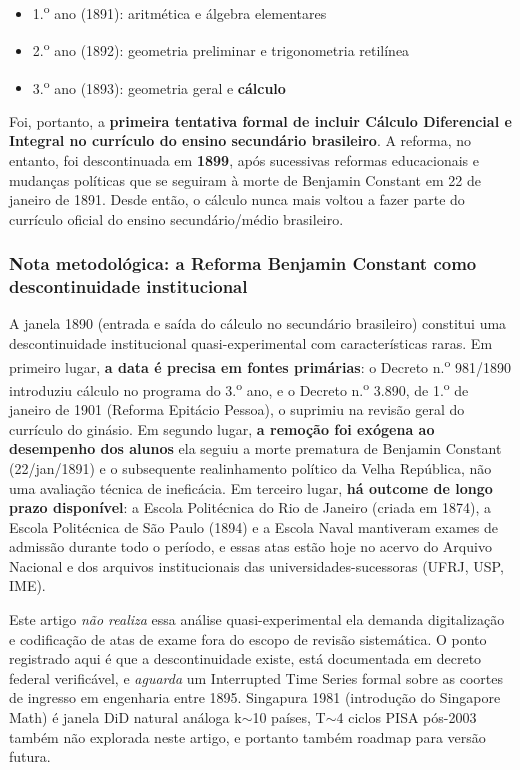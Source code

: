 \documentclass[12pt,a4paper,oneside]{article}
\begin{document}
\begin{itemize}
\item 1.\textsuperscript{o} ano (1891): aritmética e álgebra elementares
\item 2.\textsuperscript{o} ano (1892): geometria preliminar e trigonometria retilínea
\item 3.\textsuperscript{o} ano (1893): geometria geral e \textbf{cálculo}
\end{itemize}

Foi, portanto, a \textbf{primeira tentativa formal de incluir
Cálculo Diferencial e Integral no currículo do ensino secundário
brasileiro}. A reforma, no entanto, foi descontinuada em
\textbf{1899}, após sucessivas reformas educacionais e mudanças
políticas que se seguiram à morte de Benjamin Constant em 22 de
janeiro de 1891. Desde então, o cálculo nunca mais voltou a fazer
parte do currículo oficial do ensino secundário/médio brasileiro.

\subsubsection*{Nota metodológica: a Reforma Benjamin Constant como descontinuidade institucional}

A janela 1890 (entrada e saída do cálculo no
secundário brasileiro) constitui uma descontinuidade institucional
quasi-experimental com características raras. Em primeiro lugar,
\textbf{a data é precisa em fontes primárias}: o Decreto n.\textsuperscript{o}
981/1890 introduziu cálculo no programa do 3.\textsuperscript{o} ano,
e o Decreto n.\textsuperscript{o} 3.890, de 1.\textsuperscript{o}
de janeiro de 1901 (Reforma Epitácio Pessoa), o suprimiu na revisão
geral do currículo do ginásio. Em segundo lugar, \textbf{a remoção
foi exógena ao desempenho dos alunos} \textemdash{} ela seguiu a morte
prematura de Benjamin Constant (22/jan/1891) e o subsequente
realinhamento político da Velha República, não uma avaliação técnica
de ineficácia. Em terceiro lugar, \textbf{há outcome de longo prazo
disponível}: a Escola Politécnica do Rio de Janeiro (criada em 1874),
a Escola Politécnica de São Paulo (1894) e a Escola Naval mantiveram
exames de admissão durante todo o período, e essas atas estão hoje no
acervo do Arquivo Nacional e dos arquivos institucionais das
universidades-sucessoras (UFRJ, USP, IME).

Este artigo \emph{não realiza} essa análise quasi-experimental
\textemdash{} ela demanda digitalização e codificação de atas de exame
fora do escopo de revisão sistemática. O ponto registrado aqui é
que a descontinuidade existe, está documentada em decreto federal
verificável, e \emph{aguarda} um Interrupted Time Series formal
sobre as coortes de ingresso em engenharia entre
1895. Singapura 1981 (introdução do Singapore Math)
é janela DiD natural análoga \textemdash{} k$\sim$10 países,
T$\sim$4 ciclos PISA pós-2003 \textemdash{} também não explorada
neste artigo, e portanto também roadmap para versão futura.
\end{document}
